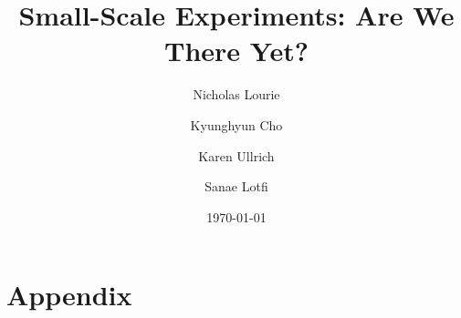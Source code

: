 \documentclass[]{fairmeta}
\title{Small-Scale Experiments: Are We There Yet?}
\author[1,2]{Nicholas Lourie}
\author[2]{Kyunghyun Cho}
\author[1, \dagger]{Karen Ullrich}
\author[1, \dagger]{Sanae Lotfi}
\affiliation[1]{FAIR at MSL Meta}
\affiliation[2]{New York University}
\date{\today}
\theoremstyle{plain}
\theoremstyle{definition}
\begin{document}
\maketitle









\clearpage





\newpage
\beginappendix
\section*{Appendix}
\clearpage
\clearpage
\clearpage
\clearpage
\clearpage
\end{document}
